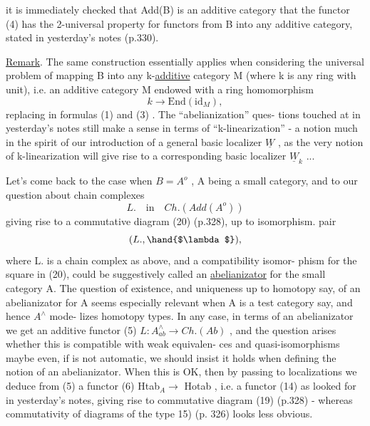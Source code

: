 
it is immediately checked that Add(B) is an additive category  that
the functor (4) has the 2-universal property for functors from B into
any additive category, stated in yesterday's notes (p.330).

\uline{Remark}. The same construction essentially applies when considering the
universal problem of mapping B into any k-\uline{additive} category M  (where
k is any  ring with unit), i.e. an additive category M endowed with a
ring homomorphism
\[ k \longrightarrow \mathrm{End}(\mathrm{id}_M) , \]
replacing  in formulas (1) and (3) . The ``abelianization'' ques-%
tions touched at in yesterday's notes still make a sense in terms of
``k-linearization'' - a notion much in the spirit of our introduction
of a general basic localizer $\underline{W}$ , as the very notion of k-linearization
will give rise to a corresponding basic localizer $\underline{W}_k$ ...

Let's come back to the case when $B=A^o$ , A being a small category,
and to our question about chain complexes
\[ L. \quad \text{in} \quad Ch.(Add(A^o)) \]
giving rise to a commutative diagram (20) (p.328), up to isomorphism.
 pair
\[ (L. , \hand{$\lambda$}) , \]
where L. is a chain complex as above, and \hand{$\lambda$} a compatibility isomor-%
phism for the square in (20), could be suggestively called an
\uline{abelianizator} for the small category A. The question of existence,
and uniqueness up to homotopy say, of an abelianizator for A seems
especially relevant when A is a test category say, and hence $A^\wedge$ mode-%
lizes homotopy types. In any case, in terms of an abelianizator we
get an additive functor
(5) \qquad $L\colon A^\wedge_{ab} \longrightarrow Ch.(Ab)$ ,
and the question arises whether this is compatible with weak equivalen-%
ces and quasi-isomorphisms\hand{;} \xout{-} maybe even, if  is not automatic, we
should insist it  holds when defining the notion of an abelianizator.
When this is OK, then by passing to localizations we deduce from (5)
a functor
(6) \qquad Htab$_A \longrightarrow$ Hotab , \margin{\unsure{,}}
i.e. a functor (14) as looked for in yesterday's notes, giving rise
to  commutative diagram (19) (p.328) - whereas commutativity of
diagrams of the type \hand{(}15) (p. 326) looks less obvious.

